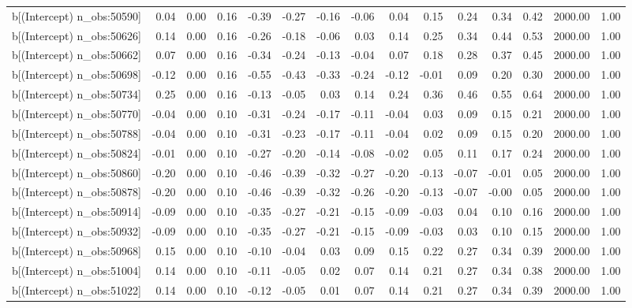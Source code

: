 \begin{table}[ht]
\begin{tabular}{rrrrrrrrrrrrrrr}
  b[(Intercept) n\_obs:50590] & 0.04 & 0.00 & 0.16 & -0.39 & -0.27 & -0.16 & -0.06 & 0.04 & 0.15 & 0.24 & 0.34 & 0.42 & 2000.00 & 1.00 \\ 
  b[(Intercept) n\_obs:50626] & 0.14 & 0.00 & 0.16 & -0.26 & -0.18 & -0.06 & 0.03 & 0.14 & 0.25 & 0.34 & 0.44 & 0.53 & 2000.00 & 1.00 \\ 
  b[(Intercept) n\_obs:50662] & 0.07 & 0.00 & 0.16 & -0.34 & -0.24 & -0.13 & -0.04 & 0.07 & 0.18 & 0.28 & 0.37 & 0.45 & 2000.00 & 1.00 \\ 
  b[(Intercept) n\_obs:50698] & -0.12 & 0.00 & 0.16 & -0.55 & -0.43 & -0.33 & -0.24 & -0.12 & -0.01 & 0.09 & 0.20 & 0.30 & 2000.00 & 1.00 \\ 
  b[(Intercept) n\_obs:50734] & 0.25 & 0.00 & 0.16 & -0.13 & -0.05 & 0.03 & 0.14 & 0.24 & 0.36 & 0.46 & 0.55 & 0.64 & 2000.00 & 1.00 \\ 
  b[(Intercept) n\_obs:50770] & -0.04 & 0.00 & 0.10 & -0.31 & -0.24 & -0.17 & -0.11 & -0.04 & 0.03 & 0.09 & 0.15 & 0.21 & 2000.00 & 1.00 \\ 
  b[(Intercept) n\_obs:50788] & -0.04 & 0.00 & 0.10 & -0.31 & -0.23 & -0.17 & -0.11 & -0.04 & 0.02 & 0.09 & 0.15 & 0.20 & 2000.00 & 1.00 \\ 
  b[(Intercept) n\_obs:50824] & -0.01 & 0.00 & 0.10 & -0.27 & -0.20 & -0.14 & -0.08 & -0.02 & 0.05 & 0.11 & 0.17 & 0.24 & 2000.00 & 1.00 \\ 
  b[(Intercept) n\_obs:50860] & -0.20 & 0.00 & 0.10 & -0.46 & -0.39 & -0.32 & -0.27 & -0.20 & -0.13 & -0.07 & -0.01 & 0.05 & 2000.00 & 1.00 \\ 
  b[(Intercept) n\_obs:50878] & -0.20 & 0.00 & 0.10 & -0.46 & -0.39 & -0.32 & -0.26 & -0.20 & -0.13 & -0.07 & -0.00 & 0.05 & 2000.00 & 1.00 \\ 
  b[(Intercept) n\_obs:50914] & -0.09 & 0.00 & 0.10 & -0.35 & -0.27 & -0.21 & -0.15 & -0.09 & -0.03 & 0.04 & 0.10 & 0.16 & 2000.00 & 1.00 \\ 
  b[(Intercept) n\_obs:50932] & -0.09 & 0.00 & 0.10 & -0.35 & -0.27 & -0.21 & -0.15 & -0.09 & -0.03 & 0.03 & 0.10 & 0.15 & 2000.00 & 1.00 \\ 
  b[(Intercept) n\_obs:50968] & 0.15 & 0.00 & 0.10 & -0.10 & -0.04 & 0.03 & 0.09 & 0.15 & 0.22 & 0.27 & 0.34 & 0.39 & 2000.00 & 1.00 \\ 
  b[(Intercept) n\_obs:51004] & 0.14 & 0.00 & 0.10 & -0.11 & -0.05 & 0.02 & 0.07 & 0.14 & 0.21 & 0.27 & 0.34 & 0.38 & 2000.00 & 1.00 \\ 
  b[(Intercept) n\_obs:51022] & 0.14 & 0.00 & 0.10 & -0.12 & -0.05 & 0.01 & 0.07 & 0.14 & 0.21 & 0.27 & 0.34 & 0.39 & 2000.00 & 1.00 \\ 

\end{tabular}
\end{table}
